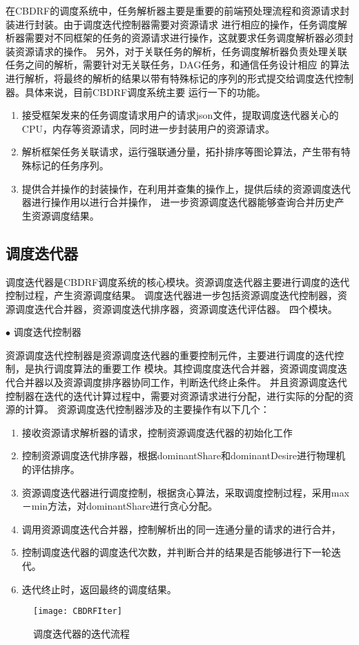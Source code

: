 在CBDRF的调度系统中，任务解析器主要是重要的前端预处理流程和资源请求封装进行封装。由于调度迭代控制器需要对资源请求
进行相应的操作，任务调度解析器需要对不同框架的任务的资源请求进行操作，这就要求任务调度解析器必须封装资源请求的操作。
另外，对于关联任务的解析，任务调度解析器负责处理关联任务之间的解析，需要针对无关联任务，DAG任务，和通信任务设计相应
的算法进行解析，将最终的解析的结果以带有特殊标记的序列的形式提交给调度迭代控制器。具体来说，目前CBDRF调度系统主要
运行一下的功能。
\begin{enumerate}
\item 接受框架发来的任务调度请求用户的请求json文件，提取调度迭代器关心的CPU，内存等资源请求，同时进一步封装用户的资源请求。
\item 解析框架任务关联请求，运行强联通分量，拓扑排序等图论算法，产生带有特殊标记的任务序列。
\item 提供合并操作的封装操作，在利用并查集的操作上，提供后续的资源调度迭代器进行操作用以进行合并操作，
进一步资源调度迭代器能够查询合并历史产生资源调度结果。
\end{enumerate}

\subsection{调度迭代器}
调度迭代器是CBDRF调度系统的核心模块。资源调度迭代器主要进行调度的迭代控制过程，产生资源调度结果。
调度迭代器进一步包括资源调度迭代控制器，资源调度迭代合并器，资源调度迭代排序器，资源调度迭代评估器。
四个模块。

$\bullet$ 调度迭代控制器

资源调度迭代控制器是资源调度迭代器的重要控制元件，主要进行调度的迭代控制，是执行调度算法的重要工作
模块。其控调度度迭代合并器，资源调度调度迭代合并器以及资源调度排序器协同工作，判断迭代终止条件。
并且资源调度迭代控制器在迭代的迭代计算过程中，需要对资源请求进行分配，进行实际的分配的资源的计算。
资源调度迭代控制器涉及的主要操作有以下几个：
\begin{enumerate}
\item 接收资源请求解析器的请求，控制资源调度迭代器的初始化工作
\item 控制资源调度迭代排序器，根据dominantShare和dominantDesire进行物理机的评估排序。
\item 资源调度迭代器进行调度控制，根据贪心算法，采取调度控制过程，采用max－min方法，对dominantShare进行贪心分配。
\item 调用资源调度迭代合并器，控制解析出的同一连通分量的请求的进行合并，
\item 控制调度迭代器的调度迭代次数，并判断合并的结果是否能够进行下一轮迭代。
\item 迭代终止时，返回最终的调度结果。
\end{enumerate}
\begin{figure}[htbp]
\centering\texttt{[image: CBDRFIter]}
\caption{调度迭代器的迭代流程}\label{fig:CBDRFIter}
\end{figure}


